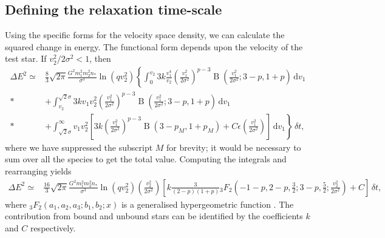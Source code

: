 \documentclass[useAMS,usedcolumn,usegraphicx,usenatbib]{mn2e}
\DeclareMathOperator{\Beta}{B}
\newcommand{\dd}{\ensuremath{\mathrm{d}}}
\newcommand{\intd}[4]{\ensuremath{\displaystyle \int_{#1}^{#2}{#3}\,\dd{#4}}}
\begin{document}
\begin{onecolumn}
\subsection{Defining the relaxation time-scale}

Using the specific forms for the velocity space density, we can calculate the squared change in energy. The functional form depends upon the velocity of the test star. If $v_2^2/2\sigma^2 < 1$, then
\begin{align}
\Delta E^2 \simeq {} & \frac{8}{3}\sqrt{2\pi}\frac{G^2m_1^2 m_2^2n_\ast}{\sigma^3}\ln\left(qv_2^2\right)\left\{\intd{0}{v_2}{3k\frac{v_1^4}{v_2}\left(\frac{v_1^2}{2\sigma^2}\right)^{p-3} \Beta\left(\frac{v_1^2}{2\sigma^2};3 - p, 1 + p\right)}{v_1} \right. \nonumber\\*
 & + \left. \intd{v_2}{\sqrt{2}\sigma}{3kv_1v_2^2\left(\frac{v_1^2}{2\sigma^2}\right)^{p-3} \Beta\left(\frac{v_1^2}{2\sigma^2};3 - p, 1 + p\right)}{v_1} \right. \nonumber\\*
 & + \left. \intd{\sqrt{2}\sigma}{\infty}{v_1v_2^2\left[3 k\left(\frac{v_1^2}{2\sigma^2}\right)^{p-3}\Beta\left(3 - p_M, 1 + p_M\right) + C\epsilon\left(\frac{v_1^2}{2\sigma^2}\right)\right]}{v_1}\right\}\,\delta t,
\end{align}
where we have suppressed the subscript $M$ for brevity; it would be necessary to sum over all the species to get the total value. Computing the integrals and rearranging yields
\begin{align}
\Delta E^2 \simeq {} & \frac{16}{3}\sqrt{2\pi}\frac{G^2m_1^2 m_2^2n_\ast}{\sigma^3}\ln\left(qv_2^2\right) \left(\frac{v_2^2}{2\sigma^2}\right) \left[k \frac{3}{(2 - p)(1 + p)}{_3F_2}\left(-1-p,2-p,\frac{3}{2};3-p,\frac{5}{2};\frac{v_2^2}{2\sigma^2}\right) + C\right]\,\delta t,
\end{align}
where ${_3F_2}(a_1,a_2,a_3;b_1,b_2;x)$ is a generalised hypergeometric function \citep[section 16]{Olver2010}. The contribution from bound and unbound stars can be identified by the coefficients $k$ and $C$ respectively.


\end{onecolumn}
\end{document}
